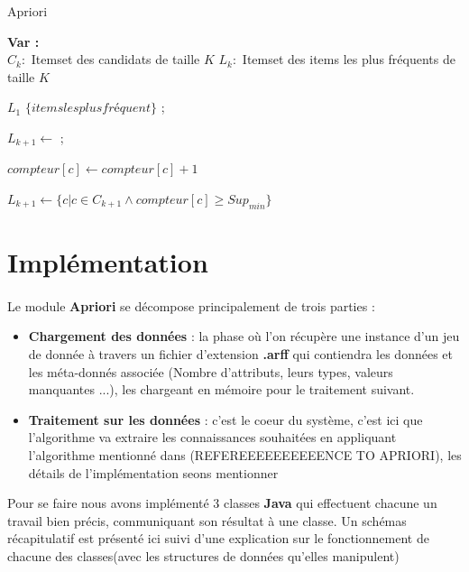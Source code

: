 	
		\begin{algorithm}[H]
			\caption{Apriori}
			
			\textbf{Var :} \\
			$C_k : $ Itemset des candidats de taille $K$
			$L_k : $ Itemset des items les plus fréquents de taille $K$
			
			
			\Begin
			{
				$L_1$ \gets $\lbrace items les plus fréquent \rbrace$ ;\\
				{
					$L_{k+1} \gets $ ;\\
					{
						{
							{
								$compteur[c] \gets compteur[c]+1$
							}
						}
						
					}
					$L_{k+1} \gets \lbrace 	c | c \in C_{k+1} \land compteur[c] \geq Sup_{min}\rbrace$ 	
				}
				
			}
		\end{algorithm}
	\section{Implémentation}
		
			\paragraph{}
			Le module \textbf{Apriori} se décompose principalement de trois parties : 
			\begin{itemize}
				\item \textbf{Chargement des données} : la phase où l'on récupère une instance d'un jeu de donnée à travers un fichier d'extension \textbf{.arff} qui contiendra les données et les méta-donnés associée (Nombre d'attributs, leurs types, valeurs manquantes ...), les chargeant en mémoire pour le traitement suivant.
				\item  \textbf{Traitement sur les données} : c'est le coeur du système, c'est ici que l'algorithme va extraire les connaissances souhaitées en appliquant l'algorithme mentionné dans (REFEREEEEEEEEEENCE TO APRIORI), les détails de l'implémentation seons mentionner 
			\end{itemize}
			\par 
			Pour se faire nous avons implémenté 3 classes \textbf{Java} qui effectuent chacune un travail bien précis, communiquant son résultat à une classe. Un schémas récapitulatif est présenté ici suivi d'une explication sur le fonctionnement de chacune des classes(avec les structures de données qu'elles manipulent)
			
